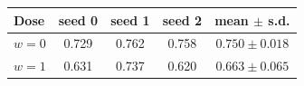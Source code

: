 \begin{tabular}{lcccc}
\toprule
Dose & seed 0 & seed 1 & seed 2 & mean $\pm$ s.d. \\
\midrule
$w=0$ & 0.729 & 0.762 & 0.758 & $0.750 \pm 0.018$ \\
$w=1$ & 0.631 & 0.737 & 0.620 & $0.663 \pm 0.065$ \\
\bottomrule
\end{tabular}

